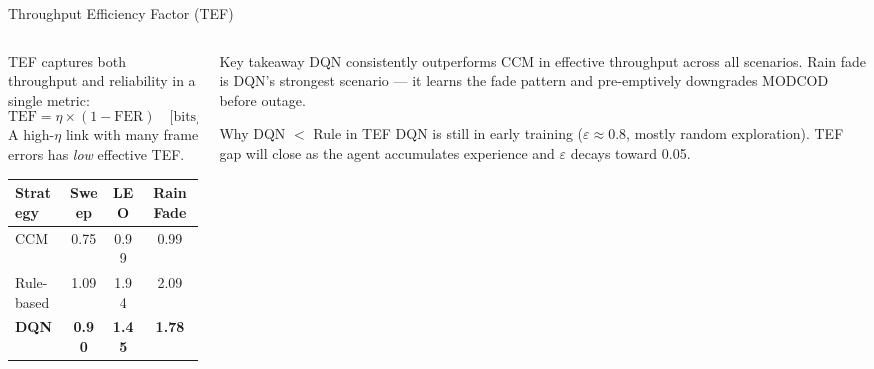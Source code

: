 \documentclass[aspectratio=169,10pt]{beamer}
\begin{document}
\begin{frame}{Throughput Efficiency Factor (TEF)}
\begin{columns}[T]
  \begin{column}{0.55\textwidth}
    \vspace{0.3em}
    TEF captures both throughput and reliability in a single metric:
    \[
      \text{TEF} = \eta \times (1 - \text{FER}) \quad \text{[bits/sym, effective]}
    \]
    A high-$\eta$ link with many frame errors has \textit{low} effective TEF.

    \vspace{0.8em}
    \renewcommand{\arraystretch}{1.3}
    \begin{tabular}{lccc}
      \toprule
      \textbf{Strategy} & \textbf{Sweep} & \textbf{LEO} & \textbf{Rain Fade} \\
      \midrule
      CCM        & 0.75 & 0.99 & 0.99 \\
      Rule-based & 1.09 & 1.94 & 2.09 \\
      \textbf{DQN} & \textbf{0.90} & \textbf{1.45} & \textbf{1.78} \\
      \bottomrule
    \end{tabular}
  \end{column}
  \begin{column}{0.42\textwidth}
    \begin{resultbox}{Key takeaway}
      \small DQN consistently outperforms CCM in effective throughput across all scenarios. Rain fade is DQN's strongest scenario — it learns the fade pattern and pre-emptively downgrades MODCOD before outage.
    \end{resultbox}

    \vspace{0.8em}
    \begin{keybox}{Why DQN $<$ Rule in TEF}
      \small DQN is still in early training ($\varepsilon \approx 0.8$, mostly random exploration). TEF gap will close as the agent accumulates experience and $\varepsilon$ decays toward 0.05.
    \end{keybox}
  \end{column}
\end{columns}
\end{frame}
\end{document}
